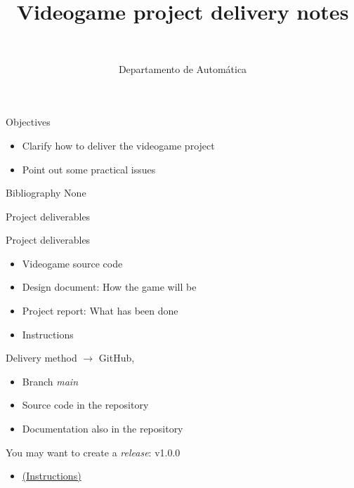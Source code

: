 \documentclass[10pt,compress]{beamer} %
\title[Videogame delivery notes]{Videogame project delivery notes}
\author{\asignatura\\\carrera}
\institute{}
\date{Departamento de Automática}
\begin{document}
{\titlepageBlue
    \begin{frame}
        \titlepage
    \end{frame}
}

\begin{frame}[plain]{}
   \begin{block}{Objectives}
   \begin{itemize}
        \item Clarify how to deliver the videogame project
		\item Point out some practical issues
	\end{itemize}
	\end{block}

   \begin{block}{Bibliography}
   		None
   \end{block}
\end{frame}



\begin{frame}{Project deliverables}
	\begin{block}{Project deliverables}
	\begin{itemize}
	\item Videogame source code
	\item Design document: How the game will be
	\item Project report: What has been done
    \item Instructions
	\end{itemize}
	\end{block}

	\bigskip
	
	Delivery method $\rightarrow$ GitHub,
	\begin{itemize}
    \item Branch \textit{main}
	\item Source code in the repository
	\item Documentation also in the repository
	\end{itemize}
    You may want to create a \textit{release}: v1.0.0
	\begin{itemize}
	    \item \href{https://docs.github.com/en/repositories/releasing-projects-on-github/managing-releases-in-a-repository}{(Instructions)}
    \end{itemize}
        
\end{frame}
\end{document}
